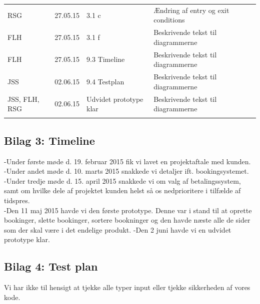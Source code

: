 \documentclass[12pt,a4paper]{article}
\begin{document}
\begin{table}[h]
\begin{tabular}{lllll}
\multicolumn{1}{|l|}{RSG}     & \multicolumn{1}{l|}{27.05.15}     & \multicolumn{1}{l|}{3.1 c}       & \multicolumn{1}{l|}{Ændring af entry og exit conditions}        &  \\ \cline{1-4}
\multicolumn{1}{|l|}{FLH}     & \multicolumn{1}{l|}{27.05.15}     & \multicolumn{1}{l|}{3.1 f}       & \multicolumn{1}{l|}{Beskrivende tekst til diagrammerne}        &  \\ \cline{1-4}
\multicolumn{1}{|l|}{FLH}     & \multicolumn{1}{l|}{27.05.15}     & \multicolumn{1}{l|}{9.3 Timeline}       & \multicolumn{1}{l|}{Beskrivende tekst til diagrammerne}        &  \\ \cline{1-4}
\multicolumn{1}{|l|}{JSS}     & \multicolumn{1}{l|}{02.06.15}     & \multicolumn{1}{l|}{9.4 Testplan}       & \multicolumn{1}{l|}{Beskrivende tekst til diagrammerne}        &  \\ \cline{1-4}
\multicolumn{1}{|l|}{JSS, FLH, RSG}     & \multicolumn{1}{l|}{02.06.15}     & \multicolumn{1}{l|}{Udvidet prototype klar}       & \multicolumn{1}{l|}{Beskrivende tekst til diagrammerne}        &  \\ \cline{1-4}
                           &                           &                             &                              & 
\end{tabular}
\end{table}
\subsection{Bilag 3: Timeline}
-Under første møde d. 19. februar 2015 fik vi lavet en projektaftale med kunden.\\
-Under andet møde d. 10. marts 2015 snakkede vi detaljer ift. bookingsystemet.\\
-Under tredje møde d. 15. april 2015 snakkede vi om valg af betalingssystem, samt om hvilke dele
af projektet kunden helst så os nedprioritere i tilfælde af tidspres.\\
-Den 11 maj 2015 havde vi den første prototype. Denne var i stand til at
oprette bookinger, slette bookinger, sortere bookninger og den havde næste
 alle de sider som der skal være i det endelige produkt.
-Den 2 juni havde vi en udvidet prototype klar.

\subsection{Bilag 4: Test plan}
Vi har ikke til hensigt at tjekke alle typer input eller tjekke sikkerheden af vores kode. 
\end{document}
